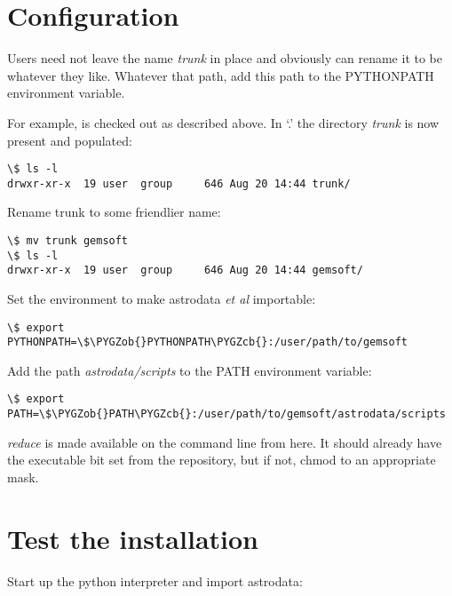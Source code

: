 \documentclass[letterpaper,10pt,english]{sphinxmanual}
\def\PYGZob{\char`\{}
\def\PYGZcb{\char`\}}
\begin{document}
\section{Configuration}
\label{userenv:configuration}\label{userenv:config}
Users need not leave the name \emph{trunk} in place and obviously can rename
it to be whatever they like. Whatever that path, add this path to the PYTHONPATH
environment variable.

For example,  is checked out as described above.
In `.' the directory \emph{trunk} is now present and populated:

\begin{Verbatim}[commandchars=\\\{\}]
\$ ls -l
drwxr-xr-x  19 user  group     646 Aug 20 14:44 trunk/
\end{Verbatim}

Rename trunk to some friendlier name:

\begin{Verbatim}[commandchars=\\\{\}]
\$ mv trunk gemsoft
\$ ls -l
drwxr-xr-x  19 user  group     646 Aug 20 14:44 gemsoft/
\end{Verbatim}

Set the environment to make astrodata \emph{et al} importable:

\begin{Verbatim}[commandchars=\\\{\}]
\$ export PYTHONPATH=\$\PYGZob{}PYTHONPATH\PYGZcb{}:/user/path/to/gemsoft
\end{Verbatim}

Add the path \emph{astrodata/scripts} to the PATH environment variable:

\begin{Verbatim}[commandchars=\\\{\}]
\$ export PATH=\$\PYGZob{}PATH\PYGZcb{}:/user/path/to/gemsoft/astrodata/scripts
\end{Verbatim}

\emph{reduce} is made available on the command line from here. It should already
have the executable bit set from the repository, but if not, chmod 
to an appropriate mask.


\section{Test the installation}
\label{userenv:test-the-installation}
Start up the python interpreter and import astrodata:
\end{document}
